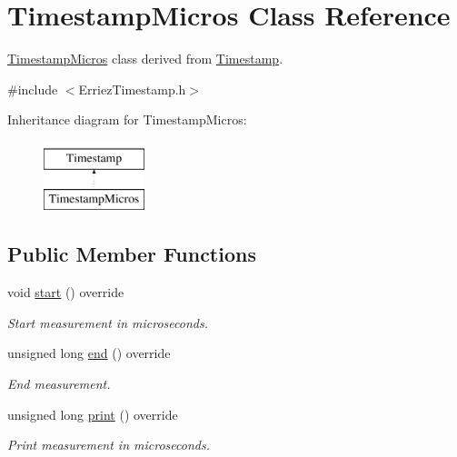 \hypertarget{class_timestamp_micros}{}\section{Timestamp\+Micros Class Reference}
\label{class_timestamp_micros}


\hyperlink{class_timestamp_micros}{Timestamp\+Micros} class derived from \hyperlink{class_timestamp}{Timestamp}.  




{\ttfamily \#include $<$Erriez\+Timestamp.\+h$>$}

Inheritance diagram for Timestamp\+Micros\+:\begin{figure}[H]
\begin{center}
\leavevmode
\includegraphics[height=2.000000cm]{class_timestamp_micros}
\end{center}
\end{figure}
\subsection*{Public Member Functions}
\begin{DoxyCompactItemize}
\item 
void \hyperlink{class_timestamp_micros_a847c7bc584b217cc901b22c1e08b013e}{start} () override\hypertarget{class_timestamp_micros_a847c7bc584b217cc901b22c1e08b013e}{}\label{class_timestamp_micros_a847c7bc584b217cc901b22c1e08b013e}

\begin{DoxyCompactList}\small\item\em Start measurement in microseconds. \end{DoxyCompactList}\item 
unsigned long \hyperlink{class_timestamp_micros_a17b22ddd75040a343cd8c8331228d3b9}{end} () override
\begin{DoxyCompactList}\small\item\em End measurement. \end{DoxyCompactList}\item 
unsigned long \hyperlink{class_timestamp_micros_a2fd08e9267a063b5b3e702c3dde87366}{print} () override
\begin{DoxyCompactList}\small\item\em Print measurement in microseconds. \end{DoxyCompactList}\end{DoxyCompactItemize}


